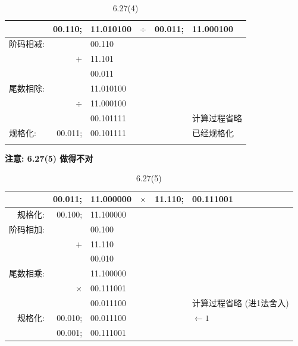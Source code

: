 \documentclass[UTF8]{report}
\newenvironment{solution}{{\noindent\hskip 2em \bf 解 \quad}}{}
\begin{document}
\begin{solution}
    \begin{table}[htb]
        \centering
        \caption{6.27(4)}
        \label{tab:6_27_4}
        \begin{tabular}{l|rlcrl}
         & 00.110; & 11.010100 & $\div$ & 00.011; & 11.000100 \\ \hline
        阶码相减: &  & 00.110 &  &  &  \\
         & $+$ & 11.101 &  &  &  \\ \cline{2-3}
         &  & 00.011 &  &  &  \\ \hline
        尾数相除: &  & 11.010100 &  &  &  \\
         & $\div$ & 11.000100 &  &  &  \\ \cline{2-3}
         &  & 00.101111 &  &  & 计算过程省略 \\ \hline
        规格化: & 00.011; & 00.101111 &  &  & 已经规格化 \\
         &  &  &  &  & 
        \end{tabular}
    \end{table}

    \textbf{注意: 6.27(5) 做得不对}

    \begin{table}[htb]
        \centering
        \caption{6.27(5)}
        \label{tab:6_27_5}
        \begin{tabular}{r|rlcrl}
         & 00.011; & 11.000000 & $\times$ & 11.110; & 00.111001 \\ \hline
        规格化: & 00.100; & 11.100000 &  &  &  \\ \hline
        阶码相加: &  & 00.100 &  &  &  \\
         & $+$ & 11.110 &  &  &  \\ \cline{2-3}
         &  & 00.010 &  &  &  \\ \hline
        尾数相乘: &  & 11.100000 &  &  &  \\
         & $\times$ & 00.111001 &  &  &  \\ \cline{2-3}
         &  & 00.011100 &  &  & 计算过程省略 (进1法舍入) \\ \hline
        规格化: & 00.010; & 00.011100 &  &  & $\leftarrow 1$ \\
         & 00.001; & 00.111001 &  &  & 
        \end{tabular}
    \end{table}


\end{solution}
\end{document}
